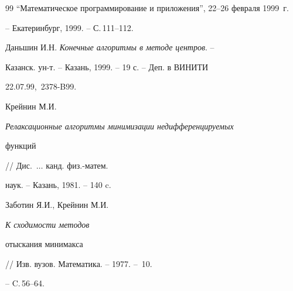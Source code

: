 \begin{thebibliography}{99}
``Математическое программирование и приложения'', 22--26 февраля 1999~г.


-- Екатеринбург, 1999. -- С.\,111--112.




Даньшин И.Н. {\em Конечные алгоритмы в методе центров}. --


Казанск. ун-т. -- Казань, 1999. -- 19 с. -- Деп. в ВИНИТИ


22.07.99, \No\,2378-B99. 




Крейнин М.И. {\em Релаксационные алгоритмы минимизации недифференцируемых 


функций} // Дис.~$\dotsc$ канд. физ.-матем.


наук. -- Казань, 1981. -- 140 c.




Заботин Я.И., Крейнин М.И. {\em К сходимости методов


отыскания минимакса} // Изв. вузов. Математика. -- 1977. -- \No\,10.


-- C.\,56--64.





\end{thebibliography}





\vskip 1cm












\label{end}





